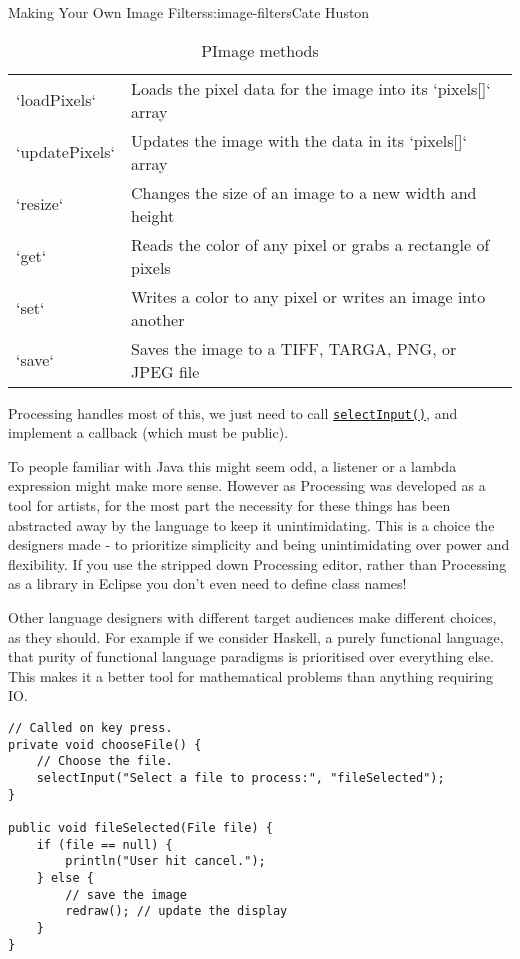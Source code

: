 \begin{aosachapter}{Making Your Own Image Filters}{s:image-filters}{Cate Huston}
\begin{table}
\centering
{\footnotesize
{}
\begin{tabular}{ll}
\hline
`loadPixels` & Loads the pixel data for the image into its `pixels[]` array \\
`updatePixels` & Updates the image with the data in its `pixels[]` array \\
`resize` & Changes the size of an image to a new width and height \\
`get` & Reads the color of any pixel or grabs a rectangle of pixels \\
`set` & Writes a color to any pixel or writes an image into another \\
`save` & Saves the image to a TIFF, TARGA, PNG, or JPEG file \\
\hline
\end{tabular}
}
\caption{PImage methods}
\label{500l.imagefilters.pimagemethods}
\end{table}

\label{file-chooser}

Processing handles most of this, we just need to call
\href{http://www.processing.org/reference/selectInput_.html}{\texttt{selectInput()}},
and implement a callback (which must be public).

To people familiar with Java this might seem odd, a listener or a lambda
expression might make more sense. However as Processing was developed as
a tool for artists, for the most part the necessity for these things has
been abstracted away by the language to keep it unintimidating. This is
a choice the designers made - to prioritize simplicity and being
unintimidating over power and flexibility. If you use the stripped down
Processing editor, rather than Processing as a library in Eclipse you
don't even need to define class names!

Other language designers with different target audiences make different
choices, as they should. For example if we consider Haskell, a purely
functional language, that purity of functional language paradigms is
prioritised over everything else. This makes it a better tool for
mathematical problems than anything requiring IO.

\begin{verbatim}
// Called on key press.
private void chooseFile() {
    // Choose the file.
    selectInput("Select a file to process:", "fileSelected");
}

public void fileSelected(File file) {
    if (file == null) {
        println("User hit cancel.");
    } else {
        // save the image
        redraw(); // update the display
    }
}
\end{verbatim}


\end{aosachapter}
